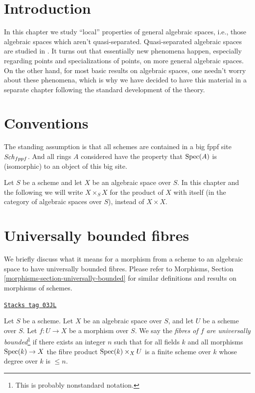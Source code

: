 \section{Introduction}
\label{decent-spaces-section-introduction}
In this chapter we study ``local'' properties of general
algebraic spaces, i.e., those algebraic spaces which aren't quasi-separated.
Quasi-separated algebraic spaces are studied in \cite{Kn}.
It turns out that essentially new phenomena happen, especially
regarding points and specializations of points, on more
general algebraic spaces. On the other hand, for most basic results
on algebraic spaces, one needn't worry about these phenomena, which is why
we have decided to have this material in a separate chapter following
the standard development of the theory.

\section{Conventions}
\label{decent-spaces-section-conventions}
The standing assumption is that all schemes are contained in
a big fppf site $\mathit{Sch}_{fppf}$. And all rings $A$ considered
have the property that $\operatorname{Spec}(A)$ is (isomorphic) to an
object of this big site.

\medskip\noindent
Let $S$ be a scheme and let $X$ be an algebraic space over $S$.
In this chapter and the following we will write $X \times_S X$
for the product of $X$ with itself (in the category of algebraic
spaces over $S$), instead of $X \times X$.

\section{Universally bounded fibres}
\label{decent-spaces-section-universally-bounded}
We briefly discuss what it means for a morphism from a scheme to an
algebraic space to have universally bounded fibres. Please refer to
Morphisms, Section \ref{morphisms-section-universally-bounded}
for similar definitions and results on morphisms of schemes.

\begin{definition}
\label{decent-spaces-definition-universally-bounded}
\href{https://stacks.math.columbia.edu/tag/03JL}{\texttt{Stacks tag 03JL}}

Let $S$ be a scheme. Let $X$ be an algebraic space over $S$, and
let $U$ be a scheme over $S$. Let $f : U \to X$ be a morphism over $S$.
We say the {\it fibres of $f$ are universally bounded}\footnote{This is
probably nonstandard notation.}
if there exists an integer $n$ such that for all fields
$k$ and all morphisms $\operatorname{Spec}(k) \to X$ the fibre
product $\operatorname{Spec}(k) \times_X U$ is a finite scheme over $k$
whose degree over $k$ is $\leq n$.
\end{definition}


